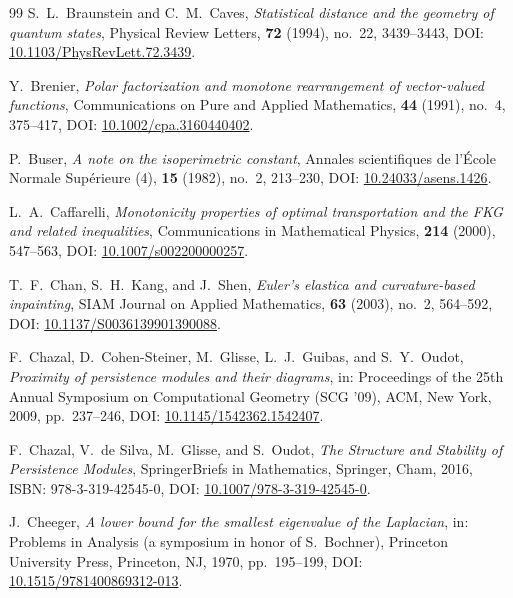 \documentclass[11pt,a4paper,reqno]{amsart}
\theoremstyle{definition}
\numberwithin{equation}{section}
\begin{document}
\begin{thebibliography}{99}
S.~L.~Braunstein and C.~M.~Caves,
\emph{Statistical distance and the geometry of quantum states},
Physical Review Letters, \textbf{72} (1994), no.~22, 3439--3443, DOI: \href{https://doi.org/10.1103/PhysRevLett.72.3439}{10.1103/PhysRevLett.72.3439}.

Y.~Brenier,
\emph{Polar factorization and monotone rearrangement of vector-valued functions},
Communications on Pure and Applied Mathematics, \textbf{44} (1991), no.~4, 375--417, DOI: \href{https://doi.org/10.1002/cpa.3160440402}{10.1002/cpa.3160440402}.

P.~Buser,
\emph{A note on the isoperimetric constant},
Annales scientifiques de l'{\'E}cole Normale Sup{\'e}rieure (4), \textbf{15} (1982), no.~2, 213--230, DOI: \href{https://doi.org/10.24033/asens.1426}{10.24033/asens.1426}.

L.~A.~Caffarelli,
\emph{Monotonicity properties of optimal transportation and the FKG and related inequalities},
Communications in Mathematical Physics, \textbf{214} (2000), 547--563, DOI: \href{https://doi.org/10.1007/s002200000257}{10.1007/s002200000257}.

T.~F.~Chan, S.~H.~Kang, and J.~Shen,
\emph{Euler's elastica and curvature-based inpainting},
SIAM Journal on Applied Mathematics, \textbf{63} (2003), no.~2, 564--592, DOI: \href{https://doi.org/10.1137/S0036139901390088}{10.1137/S0036139901390088}.

F.~Chazal, D.~Cohen-Steiner, M.~Glisse, L.~J.~Guibas, and S.~Y.~Oudot,
\emph{Proximity of persistence modules and their diagrams},
in: Proceedings of the 25th Annual Symposium on Computational Geometry (SCG '09), ACM, New York, 2009, pp.~237--246, DOI: \href{https://doi.org/10.1145/1542362.1542407}{10.1145/1542362.1542407}.

F.~Chazal, V.~de Silva, M.~Glisse, and S.~Oudot,
\emph{The Structure and Stability of Persistence Modules},
SpringerBriefs in Mathematics, Springer, Cham, 2016, ISBN: 978-3-319-42545-0, DOI: \href{https://doi.org/10.1007/978-3-319-42545-0}{10.1007/978-3-319-42545-0}.

J.~Cheeger,
\emph{A lower bound for the smallest eigenvalue of the Laplacian},
in: Problems in Analysis (a symposium in honor of S.~Bochner), Princeton University Press, Princeton, NJ, 1970, pp.~195--199, DOI: \href{https://doi.org/10.1515/9781400869312-013}{10.1515/9781400869312-013}.


\end{thebibliography}
\end{document}
